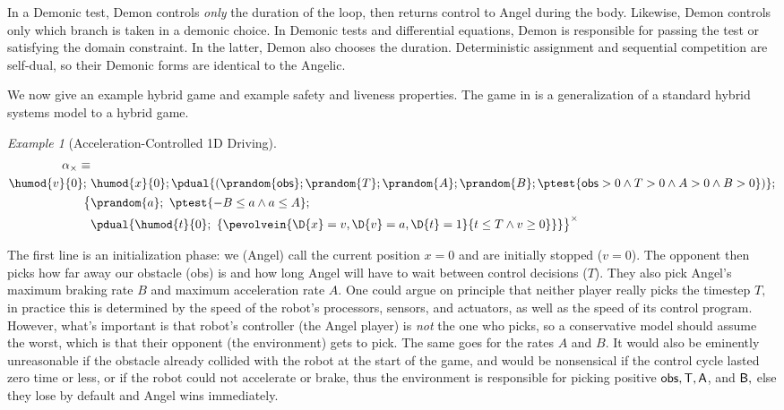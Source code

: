 \documentclass[12pt]{cmuthesis}
\theoremstyle{definition}
\theoremstyle{remark}
\newtheorem{example}{Example}
\newcommand{\obsvar}{{\sf obs}\xspace}
\newcommand{\Tvar}{{\sf T}\xspace}
\newcommand{\Avar}{{\sf A}\xspace}
\newcommand{\Bvar}{{\sf B}\xspace}
\newcommand{\rref}[2][]{\prettyref{#2}}
\begin{document}
In a Demonic test, Demon controls \emph{only} the duration of the loop, then returns control to Angel during the body.
Likewise, Demon controls only which branch is taken in a demonic choice.
In Demonic tests and differential equations, Demon is responsible for passing the test or satisfying the domain constraint.
In the latter, Demon also chooses the duration.
Deterministic assignment and sequential competition are self-dual, so their Demonic forms are identical to the Angelic.




We now give an example hybrid game and example safety and liveness properties.
The game in \rref{ex:driving-game} is a generalization of a standard hybrid systems model to a hybrid game.
\begin{example}[Acceleration-Controlled 1D Driving]
\label{ex:driving-game}
\begin{align}
\alpha_\times\equiv&\\
\label{eq:driving-init}\humod{v}{0};~&\humod{x}{0};\pdual{(\prandom{\obsvar};\prandom{T};\prandom{A};\prandom{B}; \ptest{\obsvar > 0 \land T > 0 \land A > 0 \land B > 0})};\\
\label{eq:driving-angel}\big\{ &\prandom{a};~\ptest{-B \leq a \land a \leq A};\\ 
\label{eq:driving-demon}       &\pdual{\humod{t}{0};~\{\pevolvein{\D{x}=v, \D{v}=a, \D{t}=1}{t \leq T \land v \geq 0}\}}\big\}^\times
\end{align}
\end{example}
The first line \rref{eq:driving-init} is an initialization phase: we (Angel) call the current position $x = 0$ and are initially stopped ($v = 0$).
The opponent then picks how far away our obstacle (\obsvar) is and how long Angel will have to wait between control decisions ($T$).
They also pick Angel's maximum braking rate $B$ and maximum acceleration rate $A$.
One could argue on principle that neither player really picks the timestep $T,$ in practice this is determined by the speed of the robot's processors, sensors, and actuators, as well as the speed of its control program.
However, what's important is that robot's controller (the Angel player) is \emph{not} the one who picks, so a conservative model should assume the worst, which is that their opponent (the environment) gets to pick.
The same goes for the rates $A$ and $B$.
It would also be eminently unreasonable if the obstacle already collided with the robot at the start of the game, and would be nonsensical if the control cycle lasted zero time or less, or if the robot could not accelerate or brake, thus the environment is responsible for picking positive $\obsvar, \Tvar, \Avar$, and  $\Bvar,$ else they lose by default and Angel wins immediately.
\end{document}
